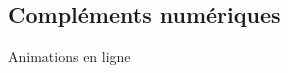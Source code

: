 \subsection{Compléments numériques}
\begin{center}
    \begin{myBox}{  Animations en ligne}
    
        \creditInstrumentPoche
    \end{myBox}

\end{center}